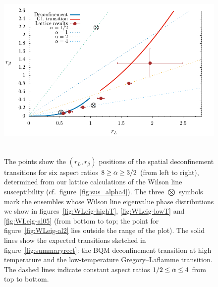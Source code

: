 \begin{figure}[tbp]
  \centering
  \includegraphics[height=9cm]{Figures/crit.pdf}
  \caption{\label{fig:crit}The points show the $(r_L, r_{\beta})$ positions of the spatial deconfinement transitions for six aspect ratios $8 \geq \alpha \geq 3 / 2$ (from left to right), determined from our lattice calculations of the Wilson line susceptibility (cf.\ figure~\protect\ref{fig:sus_alpha4}).  The three $\bigotimes$ symbols mark the ensembles whose Wilson line eigenvalue phase distributions we show in figures~\protect\ref{fig:WLeig-highT}, \protect\ref{fig:WLeig-lowT} and \protect\ref{fig:WLeig-al05} (from bottom to top; the point for figure~\protect\ref{fig:WLeig-al2} lies outside the range of the plot).  The solid lines show the expected transitions sketched in figure~\protect\ref{fig:summaryrect}: the BQM deconfinement transition at high temperature and the low-temperature Gregory--Laflamme transition.  The dashed lines indicate constant aspect ratios $1 / 2 \leq \alpha \leq 4$ from top to bottom.}
\end{figure}

